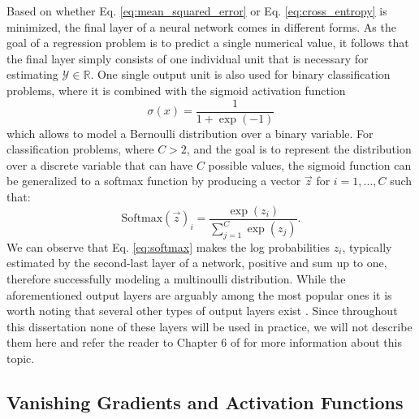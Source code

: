 Based on whether Eq. \ref{eq:mean_squared_error} or Eq. \ref{eq:cross_entropy} is minimized, the final layer of a neural network comes in different forms. As the goal of a regression problem is to predict a single numerical value, it follows that the final layer simply consists of one individual unit that is necessary for estimating $\mathcal{Y}\in\mathds{R}$. One single output unit is also used for binary classification problems, where it is combined with the sigmoid activation function
\begin{equation}
	\sigma(x) = \frac{1}{1+\exp(-1)}
	\label{eq:sigmoid}
\end{equation}
which allows to model a Bernoulli distribution over a binary variable. For classification problems, where $C>2$, and the goal is to represent the distribution over a discrete variable that can have $C$ possible values, the sigmoid function can be generalized to a softmax function by producing a vector $\vec{z}$ for $i=1,...,C$ such that:
\begin{equation}
	\text{Softmax}(\vec{z})_i = \frac{\exp(z_i)}{\sum_{j=1}^{C} \exp(z_j)}.
	\label{eq:softmax}
\end{equation}
We can observe that Eq. \ref{eq:softmax} makes the log probabilities $z_i$, typically estimated by the second-last layer of a network, positive and sum up to one, therefore successfully modeling a multinoulli distribution. While the aforementioned output layers are arguably among the most popular ones it is worth noting that several other types of output layers exist \cite{goodfellow2013maxout,graves2006connectionist}. Since throughout this dissertation none of these layers will be used in practice, we will not describe them here and refer the reader to Chapter 6 of \cite{goodfellow2016deep} for more information about this topic.

\subsection{Vanishing Gradients and Activation Functions}
\label{sec:activation_functions}


